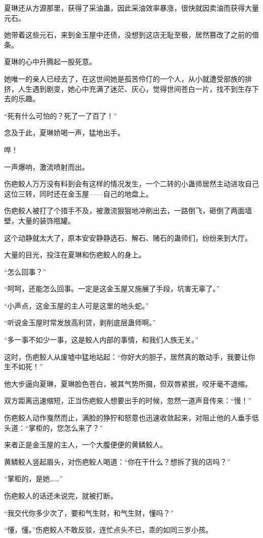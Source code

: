 \begin{this_body}
夏琳还从方源那里，获得了采油蛊，因此采油效率暴涨，很快就因卖油而获得大量元石。

她带着这些元石，来到金玉屋中还债，没想到这店无耻至极，居然篡改了之前的借条。

夏琳的心中升腾起一股死意。

她唯一的亲人已经去了，在这世间她是孤苦伶仃的一个人，从小就遭受部族的排挤，人生遇到剧变，她心中充满了迷茫、灰心，觉得世间苍白一片，找不到生存下去的乐趣。

“死有什么可怕的？死了一了百了！”

念及于此，夏琳娇喝一声，猛地出手。

哗！

一声爆响，激流喷射而出。

伤疤鲛人万万没有料到会有这样的情况发生，一个二转的小蛊师居然主动进攻自己这位三转，同时还在金玉屋——自己的地盘上。

伤疤鲛人被打了个措手不及，被激流狠狠地冲刷出去，一路倒飞，砸倒了两面墙壁，大量的装饰瓶罐。

这个动静就太大了，原本安安静静选石、解石、赌石的蛊师们，纷纷来到大厅。

大量的目光，投注在夏琳和伤疤鲛人的身上。

“怎么回事？”

“呵呵，还能怎么回事。一定是这金玉屋又施展了手段，坑害无辜了。”

“小声点，这金玉屋的主人可是这里的地头蛇。”

“听说金玉屋时常发放高利贷，剥削底层蛊师啊。”

“多一事不如少一事，这是鲛人内部的事情，和我们人族无关。”

这时，伤疤鲛人从废墟中猛地站起：“你好大的胆子，居然真的敢动手，我要让你生不如死！”

他大步逼向夏琳，夏琳脸色苍白，被其气势所摄，但双唇紧抿，咬牙毫不退缩。

双方距离迅速缩短，正当伤疤鲛人想要出手的时候，忽然一道声音传来：“慢！”

伤疤鲛人动作戛然而止，满脸的狰狞和怒意也迅速收敛起来，对阻止他的人垂手低头道：“掌柜的，您怎么来了？”

来者正是金玉屋的主人，一个大腹便便的黄鳞鲛人。

黄鳞鲛人竖起眉头，对伤疤鲛人喝道：“你在干什么？想拆了我的店吗？”

“掌柜的，是她……”

伤疤鲛人的话还未说完，就被打断。

“我交代你多少次了，要和气生财，和气生财，懂吗？”

“懂，懂。”伤疤鲛人不敢反驳，连忙点头不已，乖的如同三岁小孩。


\end{this_body}
